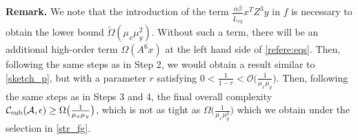 \documentclass{osudissert96}
\begin{document}
\vspace{0.2cm}
{\noindent \bf Remark.} We note that the introduction of the term $\frac{\alpha\beta}{\widetilde L_{xy}}x^TZ^3y$ in $f$ is necessary to obtain the lower bound $\widetilde \Omega (\mu_x\mu_y^{2})$. Without such a term, there will be an additional high-order term $\Omega(A^6x)$ at the left hand side of \cref{refere:eqs}. Then, following the same steps as in Step 2, we would obtain a result similar to \cref{sketch_p}, but with a parameter $r$ satisfying 
$ 0<\frac{1}{1-r}<\mathcal{O}\big( {\frac{1}{\mu_x\mu_y}} \big).$
Then, following the same steps as in Steps 3 and 4, the final overall complexity $\mathcal{C}_{\text{\normalfont sub}}(\mathcal{A},\epsilon)\geq \Omega\big( {\frac{1}{\mu_x\mu_y}} \big)$, which is not as tight as 
 $\Omega\big( {\frac{1}{\mu_x\mu^2_y}} \big)$ which we obtain under the selection in \cref{str_fg}.
\end{document}
